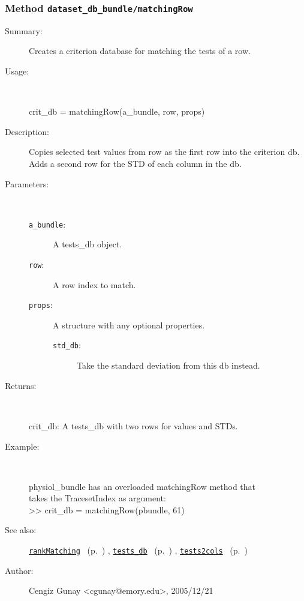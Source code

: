 \subsubsection[Method \texttt{matchingRow}]{Method \texttt{dataset\_db\_bundle/matchingRow}}%
%
\label{ref_dataset_db_bundle__matchingRow}%
\hypertarget{ref_dataset_db_bundle__matchingRow}{}%
\begin{description}
\item[Summary:]Creates a criterion database for matching the tests of a row.
%
\item[Usage:]~%
\begin{lyxcode}%
crit\_db = matchingRow(a\_bundle, row, props)
%
\end{lyxcode}%
%
\item[Description:]%
Copies selected test values from row as the first row into the 
 criterion db. Adds a second row for the STD of each column in the db.
\item[Parameters:]~
\begin{description}%
\item[\texttt{a\_bundle}:]
 A tests\_db object.
\item[\texttt{row}:]
 A row index to match.
\item[\texttt{props}:]
 A structure with any optional properties.
\begin{description}%
\item[\texttt{std\_db}:]
 Take the standard deviation from this db instead.
\end{description}%
\end{description}%
%
\item[Returns:]~

	crit\_db: A tests\_db with two rows for values and STDs.
%
\item[Example:]~
\begin{lyxcode}        physiol\_bundle has an overloaded matchingRow method that\\%
        takes the TracesetIndex as argument:\\%
        >> crit\_db = matchingRow(pbundle, 61)\\%
\end{lyxcode}
%
\item[See also:]%
\hyperlink{ref_rankMatching}{\texttt{rankMatching}}%
\ (p.~\pageref{ref_rankMatching})%
%
, \hyperlink{ref_tests_db}{\texttt{tests\_db}}%
\ (p.~\pageref{ref_tests_db})%
%
, \hyperlink{ref_tests2cols}{\texttt{tests2cols}}%
\ (p.~\pageref{ref_tests2cols})%
%
%
\item[Author:]%
Cengiz Gunay <cgunay@emory.edu>, 2005/12/21%
\end{description}
\methodline%
